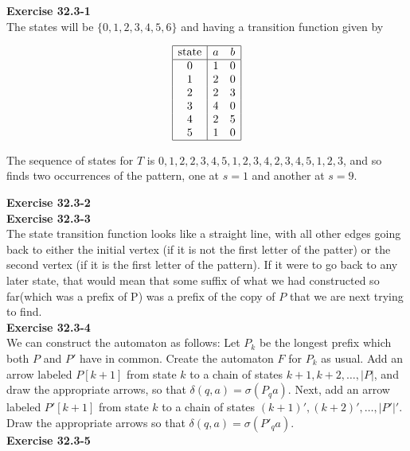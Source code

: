 \documentclass{article}
\begin{document}
\noindent\textbf{Exercise 32.3-1}\\

The states will be $\{0,1,2,3,4,5,6\}$ and having a transition function given by

\[
\begin{array}{|c|cc|}
\hline
\hbox{state}&a&b\\
\hline
0&1&0\\
1&2&0\\
2&2&3\\
3&4&0\\
4&2&5\\
5&1&0\\
\hline
\end{array}
\]

The sequence of states for $T$ is $0,1,2,2,3,4,5,1,2,3,4,2,3,4,5,1,2,3$, and so finds two occurrences of the pattern, one at $s=1$ and another at $s= 9$.

\noindent\textbf{Exercise 32.3-2}\\



\noindent\textbf{Exercise 32.3-3}\\

The state transition function looks like a straight line, with all other edges going back to either the initial vertex (if it is not the first letter of the patter) or the second vertex (if it is the first letter of the pattern). If it were to go back to any later state, that would mean that some suffix of what we had constructed so far(which was a prefix of P) was a prefix of the copy of $P$ that we are next trying to find.\\


\noindent\textbf{Exercise 32.3-4}\\

We can construct the automaton as follows: Let $P_k$ be the longest prefix which both $P$ and $P'$ have in common.  Create the automaton $F$ for $P_k$ as usual. Add an arrow labeled $P[k+1]$ from state $k$ to a chain of states $k+1, k+2, \ldots, |P|$, and draw the appropriate arrows, so that $\delta(q,a) = \sigma(P_q a)$.  Next, add an arrow labeled $P'[k+1]$ from state $k$ to a chain of states $(k+1)', (k+2)', \ldots, |P'|'$. Draw the appropriate arrows so that $\delta(q,a) = \sigma(P'_qa)$. \\

\noindent\textbf{Exercise 32.3-5}\\
\end{document}
